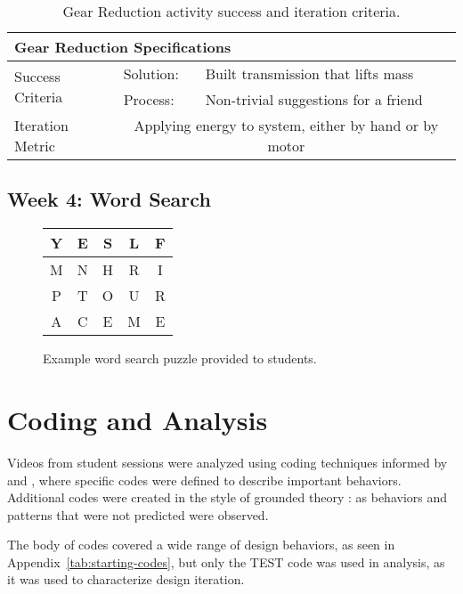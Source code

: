 	\begin{table}
	\begin{centering}
	\begin{tabular}{l  l   l}
		\multicolumn{3}{l}{{\large Gear Reduction Specifications}} \\
		\toprule
		\multirow{2}{*}{Success Criteria}  
			& Solution: 		& Built transmission that lifts mass \\ \cmidrule(r){2-3}
			& Process:		& Non-trivial suggestions for a friend \\ \midrule
		Iteration Metric	 & \multicolumn{2}{c}{Applying energy to system, either by hand or by motor}\\ 
		\bottomrule
	\end{tabular}
	\caption{Gear Reduction activity success and iteration criteria.}
	\label{tab:spec-gears}
	\end{centering}
	\end{table}

\subsection{Week 4: Word Search}
	
	\begin{figure}
	\begin{centering}
	\begin{tabular}{|c|c|c|c|c|}
	\hline 
	Y & E & S & L & F\tabularnewline
	\hline
	\hline 
	M & N & H & R & I\tabularnewline
	\hline
	\hline 
	P & T & O & U & R\tabularnewline
	\hline
	\hline 
	A & C & E & M & E\tabularnewline
	\hline
	\end{tabular}
	\par\end{centering}
	
	\caption{Example word search puzzle provided to students.}
	\label{fig:Example-word-search}
	\end{figure}
	


\section{Coding and Analysis} \label{sec:analysis-plan}
Videos from student sessions were analyzed using coding techniques informed by \citet{welch} and \citet{REESE}, where specific codes were defined to describe important behaviors. Additional codes were created in the style of grounded theory \citep{strauss97}: as behaviors and patterns that were not predicted were observed. 

The body of codes covered a wide range of design behaviors, as seen in Appendix~\ref{tab:starting-codes}, but only the TEST code was used in analysis, as it was used to characterize design iteration. 
